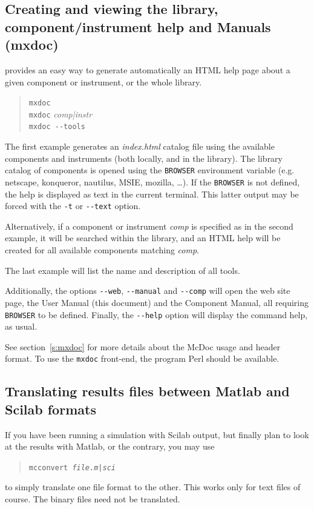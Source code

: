 \subsection{Creating and viewing the library, component/instrument help and Manuals (mxdoc)}
\label{s:mxdoc-run}

\MCX provides an easy way to generate automatically an HTML help page about a given component or instrument, or the whole \MCX library. 
\begin{quote}
  \verb|mxdoc|\\
  \verb|mxdoc| \textit{comp|instr}\\
  \verb|mxdoc --tools|
\end{quote}
The first example generates an \textit{index.html} catalog file using the available components and instruments (both locally, and in the \MCX library). The library catalog of components is opened using the \verb+BROWSER+ environment variable  (e.g. netscape, konqueror, nautilus, MSIE, mozilla, \ldots). If the \verb+BROWSER+ is not defined, the help is displayed as text in the current terminal. This latter output may be forced with the \verb+-t+ or \verb+--text+ option.

Alternatively, if a component or instrument \textit{comp} is specified as in the second example, it will be searched within the library, and an HTML help will be created for all available components matching \textit{comp}.

The last example will list the name and description of all \MCX tools.

Additionally, the options \verb+--web+, \verb+--manual+ and \verb+--comp+ will open the \MCX web site page, the User Manual (this document) and the Component Manual, all requiring \verb+BROWSER+ to be defined. Finally, the \verb+--help+ option will display the command help, as usual.

See section~\ref{s:mxdoc} for more details about the McDoc usage and header format.
To use the \verb+mxdoc+ front-end, the program Perl should be available.

\subsection{Translating \MCX results files between Matlab and Scilab formats}
\label{s:mcconvert}
 

If you have been running a \MCX simulation with Scilab output, but finally plan to look at the results with Matlab, or the contrary, you may use
\begin{quote}
  \texttt{mcconvert \textit{file.{m|sci}\/}}
\end{quote}
to simply translate one file format to the other. This works only for text files of course. The binary files need not be translated.


